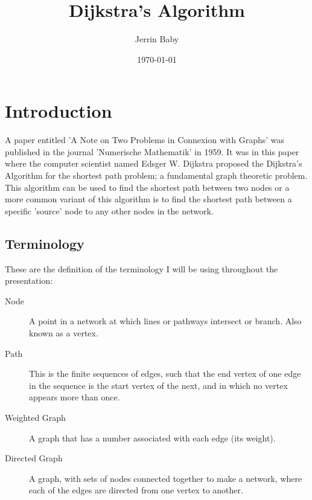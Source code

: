 \documentclass[a4paper]{article}
\title{Dijkstra's Algorithm}
\author{Jerrin Baby}
\date{\today}
\begin{document}
\maketitle

\section{Introduction}

A paper entitled 'A Note on Two Problems in Connexion with Graphs' was published in the journal 'Numerische Mathematik' in 1959. It was in this paper where the computer scientist named Edsger W. Dijkstra proposed the Dijkstra's Algorithm for the shortest path problem; a fundamental graph theoretic problem. This algorithm can be used to find the shortest path between two nodes or a more common variant of this algorithm is to find the shortest path between a specific 'source' node to any other nodes in the network.

\subsection{Terminology}
These are the definition of the terminology I will be using throughout the presentation:

\begin{description}
\item[Node] A point in a network at which lines or pathways intersect or  branch. Also known as a vertex. 
\item[Path] This is the finite sequences of edges, such that the end vertex of one edge in the sequence is the start vertex of the next, and in which no vertex appears more than once. 
\item[Weighted Graph] A graph that has a number associated with each edge (its weight).
\item[Directed Graph] A graph, with sets of nodes connected together to make a network, where each of the edges are directed from one vertex to another. 
\end{description}
\end{document}
